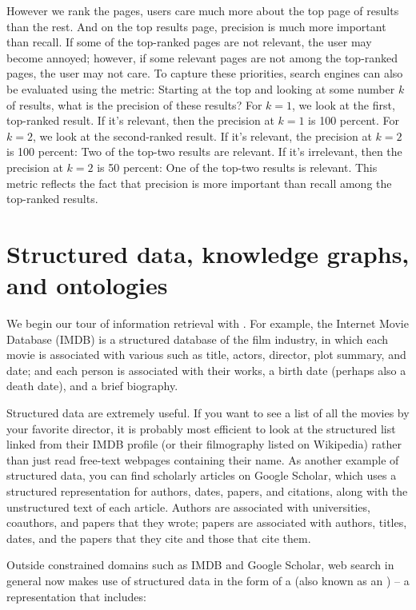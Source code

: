 However we rank the pages, users  care much more about the top page of results than the rest.  And on the top results page, precision is much more important than recall.  If some of the top-ranked pages are not relevant, the user may become annoyed; however, if some relevant pages are not among the top-ranked pages, the user may not care.  To capture these priorities, search engines can also be evaluated using the  metric: Starting at the top and looking at some number $k$ of results, what is the precision of these results?  For $k=1$, we look at the first, top-ranked result.  If it's relevant, then the precision at $k=1$ is 100 percent.  For $k=2$, we look at the second-ranked result.  If it's relevant, the precision at $k=2$ is 100 percent: Two of the top-two results are relevant.  If it's irrelevant, then the precision at $k=2$ is 50 percent: One of the top-two results is relevant.  This metric reflects the fact that precision is more important than recall among the top-ranked results.


\section{Structured data, knowledge graphs, and ontologies}
\label{sec:structured-data}

We begin our tour of information retrieval with  .  For example, the Internet Movie Database (IMDB) is a structured database of the film industry, in which each movie is associated with various  such as title, actors, director, plot summary, and date; and each person is associated with their works, a birth date (perhaps also a death date), and a brief biography.  

Structured data are extremely useful.  If you want to see a list of all the movies by your favorite director, it is probably most efficient to look at the structured list linked from their IMDB profile (or their filmography listed on Wikipedia) rather than just read free-text webpages containing their name.  As another example of structured data, you can find scholarly articles on Google Scholar, which uses a structured representation for authors, dates, papers, and citations, along with the unstructured text of each article. Authors are associated with universities, coauthors, and papers that they wrote; papers are associated with authors, titles, dates, and the papers that they cite and those that cite them.

Outside constrained domains such as IMDB and Google Scholar, web search in general now makes use of structured data in the form of a  (also known as an ) -- a representation that includes:

